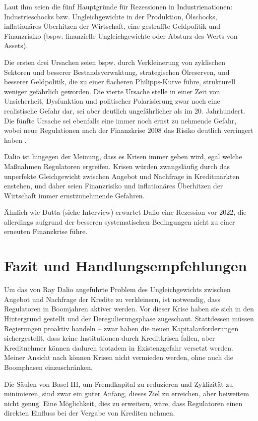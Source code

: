 \documentclass[a4paper,11pt]{report}
\begin{document}
Laut ihm seien die f\"unf Hauptgr\"unde f\"ur Rezessionen in
Industrienationen: Industrieschocks bzw. Ungleichgewichte in der Produktion,
\"Olschocks, inflation\"ares \"Uberhitzen der Wirtschaft, eine gestraffte Geldpolitik und Finanzrisiko (bspw. finanzielle Ungleichgewichte oder 
  Absturz des Werts von Assets).

Die ersten drei Ursachen seien bspw. durch Verkleinerung von zyklischen Sektoren und besserer
Bestandsverwaktung, strategischen \"Olreserven, und besserer Geldpolitik, die zu 
einer flacheren Philipps-Kurve f\"uhre, strukturell weniger gef\"ahrlich geworden.
Die vierte Ursache
stelle in einer Zeit von
Unsicherheit, Dysfunktion und politischer Polarisierung
zwar noch eine realistische Gefahr dar, sei
aber deutlich ungef\"ahrlicher als im 20. Jahrhundert.
Die f\"unfte Ursache sei ebenfalls eine immer noch ernst zu
nehmende Gefahr, wobei neue Regulationen nach der Finanzkrise
2008 das Risiko deutlich verringert haben \parencite{gs1}.

Dalio ist hingegen der Meinung, dass es Krisen immer geben wird,
egal welche Maßnahmen Regulatoren ergreifen.
Krisen w\"urden zwangsl\"aufig durch das unperfekte
Gleichgewicht zwischen Angebot und Nachfrage in Kreditm\"arkten enstehen, und
daher seien Finanzrisiko und inflation\"ares \"Uberhitzen der Wirtschaft 
immer ernstzunehmende Gefahren.

\"Ahnlich wie Dutta (siehe Interview) erwartet Dalio eine
Rezession vor 2022, die allerdings aufgrund der besseren
systematischen Bedingungen nicht zu einer erneuten Finanzkrise f\"uhre.

\section{Fazit und Handlungsempfehlungen}
Um das von Ray Dalio angef\"uhrte Problem des Ungleichgewichts zwischen
Angebot und Nachfrage der Kredite zu verkleinern, ist notwendig, dass Regulatoren in
Boomjahren aktiver werden. Vor dieser Krise haben sie sich in den Hintergrund
gestellt und der Deregulierungsphase zugeschaut.
Stattdessen m\"ussen Regierungen proaktiv handeln --
zwar haben die neuen Kapitalanforderungen sichergestellt, dass
keine Institutionen durch Kreditkrisen fallen, aber Kreditnehmer k\"onnen 
dadurch trotzdem in Existenzgefahr versetzt werden. Meiner Ansicht nach
k\"onnen Krisen nicht vermieden werden, ohne auch die Boomphasen einzuschr\"anken.

Die S\"aulen von Basel III, um Fremdkapital zu reduzieren
und Zyklizit\"at zu minimieren,
sind zwar ein guter Anfang, dieses Ziel zu erreichen, aber beiweitem nicht genug.
Eine M\"oglichkeit, dies zu erweitern, w\"are, dass
Regulatoren einen direkten Einfluss bei der Vergabe
von Krediten nehmen.
\end{document}
